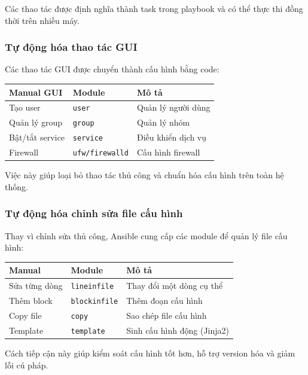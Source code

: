 \noindent Các thao tác được định nghĩa thành task trong playbook và có thể thực thi đồng thời trên nhiều máy.

\subsubsection{Tự động hóa thao tác GUI}

\noindent Các thao tác GUI được chuyển thành cấu hình bằng code:

\begin{center}
\begin{tabular}{|l|l|l|}
\hline
\textbf{Manual GUI} & \textbf{Module} & \textbf{Mô tả} \\
\hline
Tạo user & \texttt{user} & Quản lý người dùng \\
Quản lý group & \texttt{group} & Quản lý nhóm \\
Bật/tắt service & \texttt{service} & Điều khiển dịch vụ \\
Firewall & \texttt{ufw/firewalld} & Cấu hình firewall \\
\hline
\end{tabular}
\end{center}

\noindent Việc này giúp loại bỏ thao tác thủ công và chuẩn hóa cấu hình trên toàn hệ thống.

\subsubsection{Tự động hóa chỉnh sửa file cấu hình}

\noindent Thay vì chỉnh sửa thủ công, Ansible cung cấp các module để quản lý file cấu hình:

\begin{center}
\begin{tabular}{|l|l|l|}
\hline
\textbf{Manual} & \textbf{Module} & \textbf{Mô tả} \\
\hline
Sửa từng dòng & \texttt{lineinfile} & Thay đổi một dòng cụ thể \\
Thêm block & \texttt{blockinfile} & Thêm đoạn cấu hình \\
Copy file & \texttt{copy} & Sao chép file cấu hình \\
Template & \texttt{template} & Sinh cấu hình động (Jinja2) \\
\hline
\end{tabular}
\end{center}

\noindent Cách tiếp cận này giúp kiểm soát cấu hình tốt hơn, hỗ trợ version hóa và giảm lỗi cú pháp.

